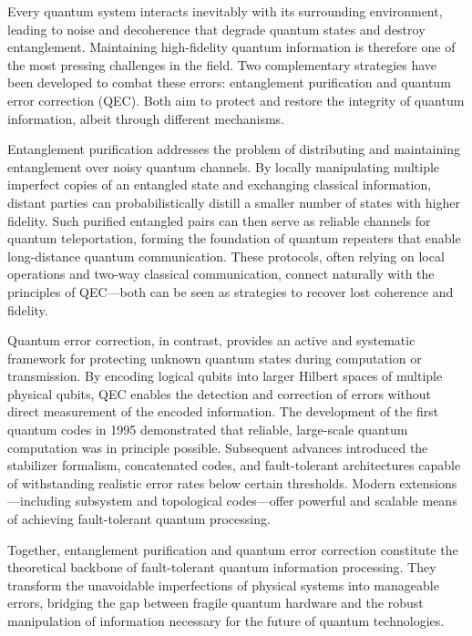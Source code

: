 \documentclass[conference]{IEEEtran}
\begin{document}
Every quantum system interacts inevitably with its surrounding environment, leading to noise and decoherence that degrade quantum states and destroy entanglement. Maintaining high-fidelity quantum information is therefore one of the most pressing challenges in the field. Two complementary strategies have been developed to combat these errors: entanglement purification and quantum error correction (QEC). Both aim to protect and restore the integrity of quantum information, albeit through different mechanisms.

Entanglement purification addresses the problem of distributing and maintaining entanglement over noisy quantum channels. By locally manipulating multiple imperfect copies of an entangled state and exchanging classical information, distant parties can probabilistically distill a smaller number of states with higher fidelity. Such purified entangled pairs can then serve as reliable channels for quantum teleportation, forming the foundation of quantum repeaters that enable long-distance quantum communication. These protocols, often relying on local operations and two-way classical communication, connect naturally with the principles of QEC—both can be seen as strategies to recover lost coherence and fidelity.

Quantum error correction, in contrast, provides an active and systematic framework for protecting unknown quantum states during computation or transmission. By encoding logical qubits into larger Hilbert spaces of multiple physical qubits, QEC enables the detection and correction of errors without direct measurement of the encoded information. The development of the first quantum codes in 1995 demonstrated that reliable, large-scale quantum computation was in principle possible. Subsequent advances introduced the stabilizer formalism, concatenated codes, and fault-tolerant architectures capable of withstanding realistic error rates below certain thresholds. Modern extensions—including subsystem and topological codes—offer powerful and scalable means of achieving fault-tolerant quantum processing.

Together, entanglement purification and quantum error correction constitute the theoretical backbone of fault-tolerant quantum information processing. They transform the unavoidable imperfections of physical systems into manageable errors, bridging the gap between fragile quantum hardware and the robust manipulation of information necessary for the future of quantum technologies.
\end{document}
